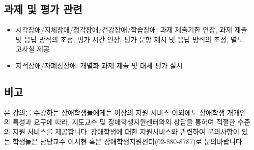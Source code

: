 \documentclass{article}
\begin{document}
\subsection{과제 및 평가 관련}
\medskip
\begin{itemize}
    \item 시각장애/지체장애/청각장애/건강장애/학습장애: 과제 제출기한 연장, 과제 제출 및 응답 방식의 조정, 평가 시간 연장, 평가 문항 제시 및 응답 방식의 조정, 별도 고사실 제공
    \item 지적장애/자폐성장애: 개별화 과제 제출 및 대체 평가 실시
\end{itemize}
\subsection{비고}
\medskip
본 강의를 수강하는 장애학생들에게는 이상의 지원 서비스 이외에도 장애학생 개개인의 특성과 요구에 따라, 지도교수 및 장애학생지원센터와의 상담을 통하여 적절한 수준의 지원 서비스를 제공합니다. 장애학생에 대한 지원서비스와 관련하여 문의사항이 있는 학생들은 담당교수 이서현 혹은 장애학생지원센터(02-880-8787)로 문의바랍니다.
\end{document}
